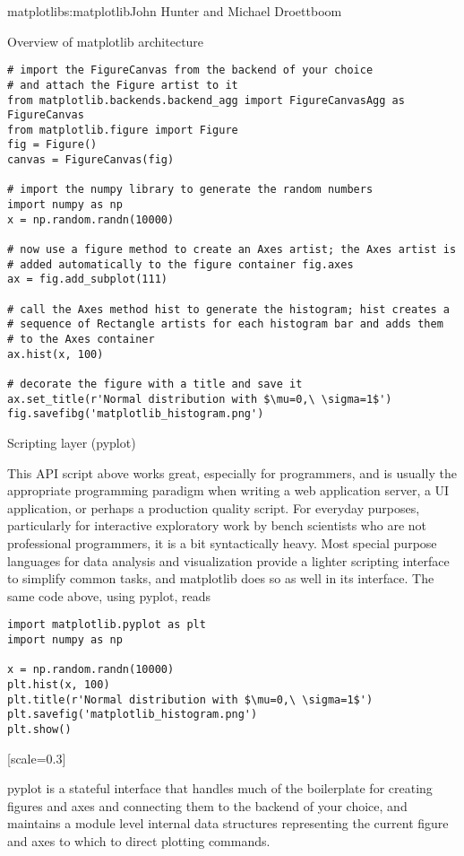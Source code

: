 \begin{aosachapter}{matplotlib}{s:matplotlib}{John Hunter and Michael Droettboom}
\begin{aosasect1}{Overview of matplotlib architecture}
\begin{verbatim}
# import the FigureCanvas from the backend of your choice
# and attach the Figure artist to it
from matplotlib.backends.backend_agg import FigureCanvasAgg as FigureCanvas
from matplotlib.figure import Figure
fig = Figure()
canvas = FigureCanvas(fig)

# import the numpy library to generate the random numbers
import numpy as np
x = np.random.randn(10000)

# now use a figure method to create an Axes artist; the Axes artist is
# added automatically to the figure container fig.axes
ax = fig.add_subplot(111)

# call the Axes method hist to generate the histogram; hist creates a
# sequence of Rectangle artists for each histogram bar and adds them
# to the Axes container
ax.hist(x, 100)

# decorate the figure with a title and save it
ax.set_title(r'Normal distribution with $\mu=0,\ \sigma=1$')
fig.savefibg('matplotlib_histogram.png')
\end{verbatim}

\begin{aosasect2}{Scripting layer (pyplot)}


This API script above works great, especially for programmers, and is
usually the appropriate programming paradigm when writing a web
application server, a UI application, or perhaps a production quality
script.  For everyday purposes, particularly for interactive
exploratory work by bench scientists who are not professional
programmers, it is a bit syntactically heavy.  Most special purpose
languages for data analysis and visualization provide a lighter
scripting interface to simplify common tasks, and matplotlib does so
as well in its  interface.  The same code
above, using pyplot, reads

\begin{verbatim}
import matplotlib.pyplot as plt
import numpy as np

x = np.random.randn(10000)
plt.hist(x, 100)
plt.title(r'Normal distribution with $\mu=0,\ \sigma=1$')
plt.savefig('matplotlib_histogram.png')
plt.show()
\end{verbatim}

[scale=0.3]


pyplot is a stateful interface that handles much of the boilerplate
for creating figures and axes and connecting them to the backend of
your choice, and maintains a module level internal data structures
representing the current figure and axes to which to direct plotting
commands.


\end{aosasect2}
\end{aosasect1}
\end{aosachapter}
